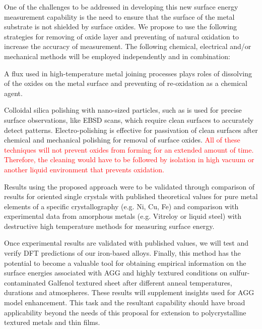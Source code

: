 One of the challenges to be addressed in developing this new surface energy measurement capability is the need to ensure that the surface of the metal substrate is not shielded by surface oxides. We propose to use the following strategies for removing of oxide layer and preventing of natural oxidation to increase the accuracy of measurement. The following chemical, electrical and/or mechanical methods will be employed independently and in combination:
\begin{outline}
	\1 A flux used in high-temperature metal joining processes plays roles of dissolving of the oxides on the metal surface and preventing of re-oxidation as a chemical agent.
		
	\1 Colloidal silica polishing with nano-sized particles, such as is used for precise surface observations, like EBSD scans, which require clean surfaces to accurately detect patterns.
	\1 Electro-polishing is effective for passivation of clean surfaces after chemical and mechanical polishing for removal of surface oxides. 
	\1 \textcolor{red}{All of these techniques will not prevent oxides from forming for an extended amount of time. Therefore, the cleaning would have to be followed by isolation in high vacuum or another liquid environment that prevents oxidation.} 
\end{outline}
Results using the proposed approach were to be validated through comparison of results for oriented single crystals with published theoretical values for pure metal elements of a specific crystallography (e.g. Ni, Cu, Fe)  and comparison with experimental data from amorphous metals (e.g. Vitreloy or liquid steel) with destructive high temperature methods for measuring surface energy. 

Once experimental results are validated with published values, we will test and verify DFT predictions of our iron-based alloys. Finally, this method has the potential to become a valuable tool for obtaining empirical information on the surface energies associated with AGG and highly textured conditions on sulfur-contaminated Galfenol textured sheet after different anneal temperatures, durations and atmospheres. These results will supplement insights used for AGG model enhancement. This task and the resultant capability should have broad applicability beyond the needs of this proposal for extension to polycrystalline textured metals and thin films.




